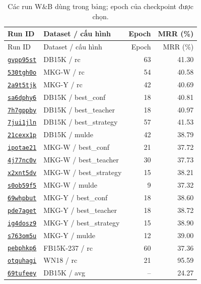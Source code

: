 \begin{longtable}{@{}llrr@{}}
\caption{Các run W\&B dùng trong bảng; epoch của checkpoint được chọn.}\label{tab:dsom_run_index}\\
\toprule Run ID & Dataset / cấu hình & Epoch & MRR (\%) \\ \midrule
\endfirsthead
\toprule Run ID & Dataset / cấu hình & Epoch & MRR (\%) \\ \midrule \endhead
\href{\dsomrunbase gvpp95st}{\texttt{gvpp95st}} & DB15K / rc & 63 & 41.30 \\
\href{\dsomrunbase 530tgh0o}{\texttt{530tgh0o}} & MKG-W / rc & 54 & 40.58 \\
\href{\dsomrunbase 2a9t5tjk}{\texttt{2a9t5tjk}} & MKG-Y / rc & 42 & 40.69 \\
\href{\dsomrunbase sa6dphy6}{\texttt{sa6dphy6}} & DB15K / best\_conf & 18 & 40.81 \\
\href{\dsomrunbase 7h7gppby}{\texttt{7h7gppby}} & DB15K / best\_teacher & 18 & 40.97 \\
\href{\dsomrunbase 7jui1jln}{\texttt{7jui1jln}} & DB15K / best\_strategy & 57 & 41.53 \\
\href{\dsomrunbase 21cexx1p}{\texttt{21cexx1p}} & DB15K / mulde & 42 & 38.79 \\
\href{\dsomrunbase ipotae21}{\texttt{ipotae21}} & MKG-W / best\_conf & 21 & 37.72 \\
\href{\dsomrunbase 4j77nc0v}{\texttt{4j77nc0v}} & MKG-W / best\_teacher & 30 & 37.73 \\
\href{\dsomrunbase x2xnt5dv}{\texttt{x2xnt5dv}} & MKG-W / best\_strategy & 15 & 38.21 \\
\href{\dsomrunbase s0ob59f5}{\texttt{s0ob59f5}} & MKG-W / mulde & 9 & 37.32 \\
\href{\dsomrunbase 69whpbut}{\texttt{69whpbut}} & MKG-Y / best\_conf & 18 & 38.60 \\
\href{\dsomrunbase pde7aget}{\texttt{pde7aget}} & MKG-Y / best\_teacher & 18 & 38.72 \\
\href{\dsomrunbase ig4dosz9}{\texttt{ig4dosz9}} & MKG-Y / best\_strategy & 15 & 38.90 \\
\href{\dsomrunbase s763om5u}{\texttt{s763om5u}} & MKG-Y / mulde & 12 & 39.00 \\
\href{\dsomrunbase pebphkp6}{\texttt{pebphkp6}} & FB15K-237 / rc & 60 & 37.36 \\
\href{\dsomrunbase otquhagi}{\texttt{otquhagi}} & WN18 / rc & 21 & 95.59 \\
\href{\dsomrunbase 69tufeey}{\texttt{69tufeey}} & DB15K / avg & -- & 24.27 \\

\end{longtable}
